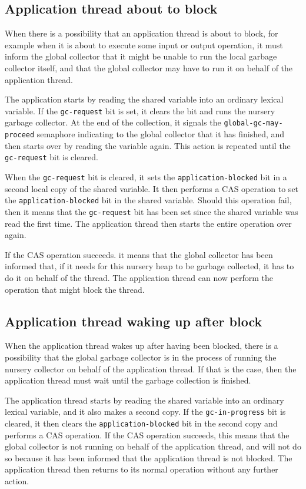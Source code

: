 \subsection{Application thread about to block}

When there is a possibility that an application thread is about to
block, for example when it is about to execute some input or output
operation,  it must inform the global collector that it might be
unable to run the local garbage collector itself, and that the global
collector may have to run it on behalf of the application thread.

The application starts by reading the shared variable into an ordinary
lexical variable.  If the \texttt{gc-request} bit is set, it clears
the bit and runs the nursery garbage collector.  At the end of the
collection, it signals the \texttt{global-gc-may-proceed} semaphore
indicating to the global collector that it has finished, and then
starts over by reading the variable again.  This action is repeated
until the \texttt{gc-request} bit is cleared.

When the \texttt{gc-request} bit is cleared, it sets the
\texttt{application-blocked} bit in a second local copy of the shared
variable.  It then performs a CAS operation to set the
\texttt{application-blocked} bit in the shared variable.  Should this
operation fail, then it means that the \texttt{gc-request} bit has
been set since the shared variable was read the first time.  The
application thread then starts the entire operation over again.

If the CAS operation succeeds. it means that the global collector has
been informed that, if it needs for this nursery heap to be garbage
collected, it has to do it on behalf of the thread.  The application
thread can now perform the operation that might block the thread.

\subsection{Application thread waking up after block}

When the application thread wakes up after having been blocked, there
is a possibility that the global garbage collector is in the process
of running the nursery collector on behalf of the application thread.
If that is the case, then the application thread must wait until the
garbage collection is finished.

The application thread starts by reading the shared variable into an
ordinary lexical variable, and it also makes a second copy.  If the
\texttt{gc-in-progress} bit is cleared, it then clears the
\texttt{application-blocked} bit in the second copy and performs a CAS
operation.  If the CAS operation succeeds, this means that the global
collector is not running on behalf of the application thread, and will
not do so because it has been informed that the application thread is
not blocked.  The application thread then returns to its normal
operation without any further action.

